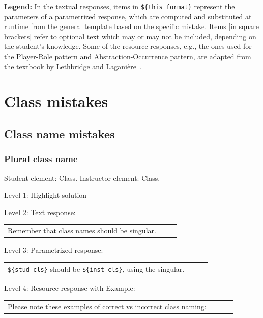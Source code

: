 

\textbf{Legend:}
In the textual responses, items in \verb|${this format}| represent the parameters of
a parametrized response, which are computed and substituted at runtime from the general
template based on the specific mistake. Items [in square brackets] refer to optional
text which may or may not be included, depending on the student's knowledge.
Some of the resource responses, e.g., the ones used for the Player-Role pattern and
Abstraction-Occurrence pattern, are adapted from the textbook by
Lethbridge and Laganière~\cite{Lethbridge05}.

\section{Class mistakes}

\subsection{Class name mistakes}

\subsubsection{Plural class name}

Student element: Class. Instructor element: Class. \medskip

\noindent Level 1: Highlight solution  \medskip

\noindent Level 2: Text response: \medskip

\begin{tabular}{|p{0.9\linewidth}}
Remember that class names should be singular.
\end{tabular} \medskip

\noindent Level 3: Parametrized response: \medskip

\begin{tabular}{|p{0.9\linewidth}}
\verb|${stud_cls}| should be \verb|${inst_cls}|, using the singular.
\end{tabular} \medskip

\noindent Level 4: Resource response with Example: \medskip

\begin{tabular}{|p{0.9\linewidth}}
Please note these examples of correct vs incorrect class naming:
\end{tabular} \medskip

